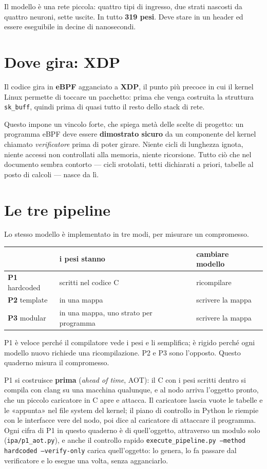 \documentclass[11pt,a4paper,oneside]{report}
\begin{document}
Il modello è una rete piccola: quattro tipi di ingresso, due strati nascosti da
quattro neuroni, sette uscite. In tutto \textbf{319 pesi}. Deve stare in un
header ed essere eseguibile in decine di nanosecondi.

\section{Dove gira: XDP}

Il codice gira in \textbf{eBPF} agganciato a \textbf{XDP}, il punto più
precoce in cui il kernel Linux permette di toccare un pacchetto: prima che
venga costruita la struttura \texttt{sk\_buff}, quindi prima di quasi tutto il
resto dello stack di rete.

Questo impone un vincolo forte, che spiega metà delle scelte di progetto: un
programma eBPF deve essere \textbf{dimostrato sicuro} da un componente del
kernel chiamato \emph{verificatore} prima di poter girare. Niente cicli di
lunghezza ignota, niente accessi non controllati alla memoria, niente
ricorsione. Tutto ciò che nel documento sembra contorto — cicli srotolati,
tetti dichiarati a priori, tabelle al posto di calcoli — nasce da lì.

\section{Le tre pipeline}

Lo stesso modello è implementato in tre modi, per misurare un compromesso.

\begin{center}
\small
\begin{tabular}{@{}lll@{}}
\toprule
& \textbf{i pesi stanno} & \textbf{cambiare modello} \\
\midrule
\textbf{P1} hardcoded & scritti nel codice C & ricompilare \\
\textbf{P2} template  & in una mappa         & scrivere la mappa \\
\textbf{P3} modular   & in una mappa, uno strato per programma & scrivere la mappa \\
\bottomrule
\end{tabular}
\end{center}

P1 è veloce perché il compilatore vede i pesi e li semplifica; è rigido perché
ogni modello nuovo richiede una ricompilazione. P2 e P3 sono l'opposto. Questo
quaderno misura il compromesso.

P1 si costruisce \textbf{prima} (\emph{ahead of time}, AOT): il C con i pesi
scritti dentro si compila con clang su una macchina qualunque, e al nodo arriva
l'oggetto pronto, che un piccolo caricatore in C apre e attacca. Il caricatore
lascia vuote le tabelle e le «appunta» nel file system del kernel; il piano di
controllo in Python le riempie con le interfacce vere del nodo, poi dice al
caricatore di attaccare il programma. Ogni cifra di P1 in questo quaderno è di
quell'oggetto, attraverso un modulo solo (\texttt{ipa/p1\_aot.py}), e anche il
controllo rapido \texttt{execute\_pipeline.py --method hardcoded --verify-only}
carica quell'oggetto: lo genera, lo fa passare dal verificatore e lo esegue una
volta, senza agganciarlo.
\end{document}
